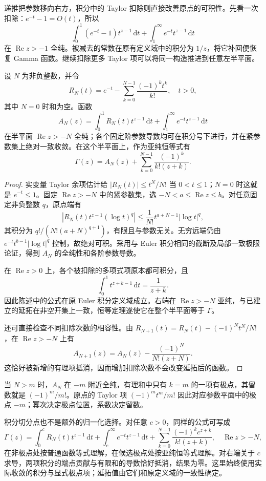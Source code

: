 \ProseParagraphBreak

递推把参数移向右方，积分中的 Taylor 扣除则直接改善原点的可积性。先看一次扣除：\(e^{-t}-1=O(t)\)，所以
\[
 \int_0^1(e^{-t}-1)t^{z-1}\,\mathrm{d}t
 +\int_1^\infty e^{-t}t^{z-1}\,\mathrm{d}t
\]
在 \(\operatorname{Re}z>-1\) 全纯。被减去的常数在原有定义域中的积分为 \(1/z\)，将它补回便恢复 Gamma 函数。继续扣除更多 Taylor 项可以将同一构造推进到任意左半平面。

\begin{proposition}\label{b3:prop:21-taylor-regularization}
设 \(N\) 为非负整数，并令
\[
 R_N(t)=e^{-t}-\sum_{k=0}^{N-1}\frac{(-1)^k t^k}{k!},\quad t>0,
\]
其中 \(N=0\) 时和为空。函数
\[
 A_N(z)=\int_0^1R_N(t)t^{z-1}\,\mathrm{d}t
       +\int_1^\infty e^{-t}t^{z-1}\,\mathrm{d}t
\]
在半平面 \(\operatorname{Re}z>-N\) 全纯；各个固定阶参数导数均可在积分号下进行，并在紧参数集上绝对一致收敛。在这个半平面上，作为亚纯恒等式有
\[
 \Gamma(z)=A_N(z)+\sum_{k=0}^{N-1}\frac{(-1)^k}{k!(z+k)}.
\]
\end{proposition}
\begin{proof}
实变量 Taylor 余项估计给 \(|R_N(t)|\le t^N/N!\) 当 \(0<t\le1\)；\(N=0\) 时这就是 \(e^{-t}\le1\)。固定 \(\operatorname{Re}z>-N\) 中的紧参数集，选 \(-N<a\le\operatorname{Re}z\le b\)。对任意固定非负整数 \(q\)，原点端有
\[
 |R_N(t)t^{z-1}(\log t)^q|
 \le\frac1{N!}t^{a+N-1}|\log t|^q,
\]
其积分为 \(q!/(N!(a+N)^{q+1})\)，有限且与参数无关。无穷远端仍由 \(e^{-t}t^{b-1}|\log t|^q\) 控制，故绝对可积。采用与 Euler 积分相同的截断及局部一致极限论证，得到 \(A_N\) 的全纯性和各阶参数导数。

在 \(\operatorname{Re}z>0\) 上，各个被扣除的多项式项原本都可积分，且
\[
 \int_0^1t^{z+k-1}\,\mathrm{d}t=\frac1{z+k}.
\]
因此陈述中的公式在原 Euler 积分定义域成立。右端在 \(\operatorname{Re}z>-N\) 亚纯，与已建立的延拓在非空开集上一致，恒等定理遂使它在整个半平面等于 \(\Gamma\)。

还可直接检查不同扣除次数的相容性。由 \(R_{N+1}(t)=R_N(t)-(-1)^Nt^N/N!\)，在 \(\operatorname{Re}z>-N\) 上有
\[
 A_{N+1}(z)=A_N(z)-\frac{(-1)^N}{N!(z+N)}.
\]
这恰好被新增的有理项抵消，因而增加扣除次数不会改变延拓后的函数。
\end{proof}
当 \(N>m\) 时，\(A_N\) 在 \(-m\) 附近全纯，有理和中只有 \(k=m\) 的一项有极点，其留数就是 \((-1)^m/m!\)。原点的 Taylor 项 \((-1)^m t^m/m!\) 因此对应参数平面中的极点 \(-m\)；幂次决定极点位置，系数决定留数。

\ProseParagraphBreak

积分切分点也不是额外的归一化选择。对任意 \(c>0\)，同样的公式可写成
\[
 \Gamma(z)=\int_0^cR_N(t)t^{z-1}\,\mathrm{d}t
 +\int_c^\infty e^{-t}t^{z-1}\,\mathrm{d}t
 +\sum_{k=0}^{N-1}\frac{(-1)^k c^{z+k}}{k!(z+k)},
 \quad \operatorname{Re}z>-N,
\]
在非极点处按普通函数等式理解，在候选极点处按亚纯恒等式理解。对右端关于 \(c\) 求导，两项积分的端点贡献与有限和的导数恰好抵消，结果为零。这里始终使用实际收敛的积分与显式极点项；延拓值由它们和原定义域的一致性确定。
